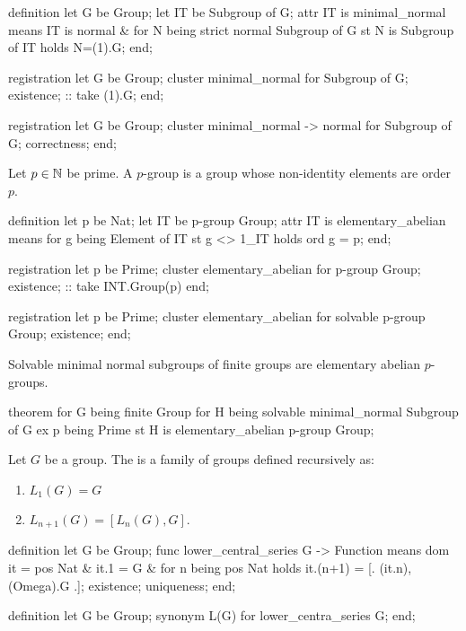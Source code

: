 \begin{mizar}
definition
  let G be Group;
  let IT be Subgroup of G;
  attr IT is minimal_normal means
  IT is normal & for N being strict normal Subgroup of G
  st N is Subgroup of IT holds N=(1).G;
end;

registration
  let G be Group;
  cluster minimal_normal for Subgroup of G;
  existence; :: take (1).G;
end;

registration
  let G be Group;
  cluster minimal_normal -> normal for Subgroup of G;
  correctness;
end;
\end{mizar}

\begin{definition}
Let $p\in\mathbb{N}$ be prime.
A  $p$-group is a group whose non-identity
elements are order $p$.
\end{definition}

\begin{mizar}
definition
  let p be Nat;
  let IT be p-group Group;
  attr IT is elementary_abelian means
  for g being Element of IT st g <> 1_IT holds ord g = p;
end;

registration
  let p be Prime;
  cluster elementary_abelian for p-group Group;
  existence; :: take INT.Group(p)
end;

registration
  let p be Prime;
  cluster elementary_abelian for solvable p-group Group;
  existence;
end;
\end{mizar}

\begin{theorem}
Solvable minimal normal subgroups of finite groups are elementary
abelian $p$-groups.
\end{theorem}

\begin{mizar}
theorem
  for G being finite Group
  for H being solvable minimal_normal Subgroup of G
  ex p being Prime st H is elementary_abelian p-group Group;
\end{mizar}

\begin{definition}
Let $G$ be a group. The  is a family of
groups defined recursively as:
\begin{enumerate}
\item $L_{1}(G) = G$
\item $L_{n+1}(G) = [L_{n}(G), G]$.
\end{enumerate}
\end{definition}

\begin{mizar}
definition
  let G be Group;
  func lower_central_series G -> Function means
  dom it = pos Nat & it.1 = G
  & for n being pos Nat holds it.(n+1) = [. (it.n), (Omega).G .];
  existence;
  uniqueness;
end;

definition
  let G be Group;
  synonym L(G) for lower_centra_series G;
end;
\end{mizar}


